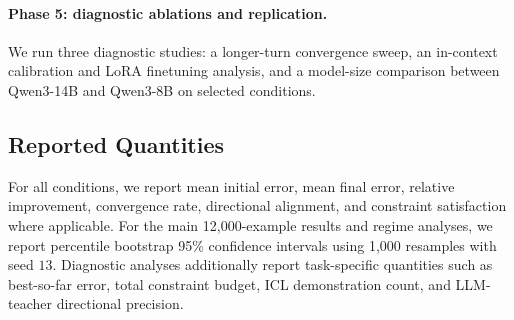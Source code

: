 \documentclass[11pt]{article}
\begin{document}
\paragraph{Phase 5: diagnostic ablations and replication.}
We run three diagnostic studies: a longer-turn convergence sweep, an
in-context calibration and LoRA finetuning analysis, and a model-size
comparison between Qwen3-14B and Qwen3-8B on selected conditions.

\subsection{Reported Quantities}
\label{sec:reported_quantities}

For all conditions, we report mean initial error, mean final error, relative
improvement, convergence rate, directional alignment, and constraint
satisfaction where applicable. For the main 12{,}000-example results and
regime analyses, we report percentile bootstrap 95\% confidence intervals
using 1{,}000 resamples with seed $13$. Diagnostic analyses additionally
report task-specific quantities such as best-so-far error, total constraint
budget, ICL demonstration count, and LLM-teacher directional precision.






\end{document}
